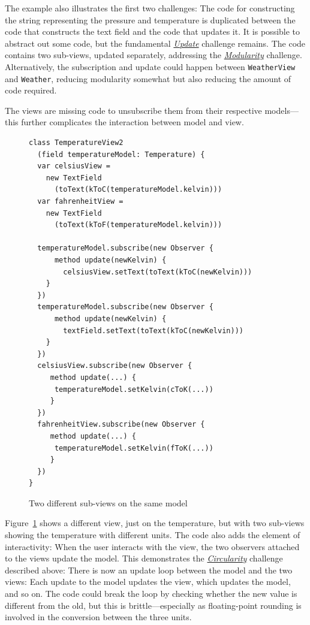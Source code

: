 \documentclass[sigplan,screen]{acmart}
\begin{document}
The example also illustrates the first two challenges:
The code for constructing the string representing the pressure
and temperature is duplicated between the code that constructs the
text field and the code that updates it.  It is possible to abstract
out some code, but the fundamental
\hyperlink{challenge:update}{\textit{Update}} challenge remains.
The code contains two sub-views, updated separately, addressing the
\hyperlink{challenge:modularity}{\textit{Modularity}} challenge.
Alternatively, the subscription and update could happen between
\texttt{WeatherView} and \texttt{Weather}, reducing modularity
somewhat but also reducing the amount of code required.

The views are missing code to unsubscribe them from their
respective models---this further complicates the interaction between
model and view.

\begin{figure}[tb]
\begin{verbatim}
class TemperatureView2
  (field temperatureModel: Temperature) {
  var celsiusView =
    new TextField
      (toText(kToC(temperatureModel.kelvin)))
  var fahrenheitView =
    new TextField
      (toText(kToF(temperatureModel.kelvin)))

  temperatureModel.subscribe(new Observer {
      method update(newKelvin) {
        celsiusView.setText(toText(kToC(newKelvin)))
    }
  })
  temperatureModel.subscribe(new Observer {
      method update(newKelvin) {
        textField.setText(toText(kToC(newKelvin)))
    }
  })
  celsiusView.subscribe(new Observer {
     method update(...) {
      temperatureModel.setKelvin(cToK(...))
     }
  })
  fahrenheitView.subscribe(new Observer {
     method update(...) {
      temperatureModel.setKelvin(fToK(...))
     }
  })
}
\end{verbatim}
  \vspace*{-2ex}
  \caption{Two different sub-views on the same model}
  \label{fig:temperature-view2}
\end{figure}
%
Figure~\ref{fig:temperature-view2} shows a different view, just on the
temperature, but with two sub-views showing the temperature with
different units.  The code also adds the element of interactivity:
When the user interacts with the view, the two observers attached to
the views update the model.  This demonstrates the
\hyperlink{challenge:circularity}{\textit{Circularity}} challenge
described above: There is now an update loop between the model and
the two views: Each update to the model updates the view, which
updates the model, and so on.  The code could break the loop by
checking whether the new value is different from the old, but this is brittle---especially as
floating-point rounding is involved in the conversion between the
three units.
\end{document}
